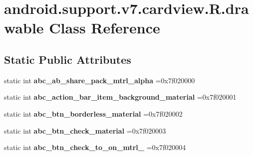 \hypertarget{classandroid_1_1support_1_1v7_1_1cardview_1_1R_1_1drawable}{}\section{android.\+support.\+v7.\+cardview.\+R.\+drawable Class Reference}
\label{classandroid_1_1support_1_1v7_1_1cardview_1_1R_1_1drawable}
\subsection*{Static Public Attributes}
\begin{DoxyCompactItemize}
\item 
\mbox{\label{classandroid_1_1support_1_1v7_1_1cardview_1_1R_1_1drawable_ab42b228f8b8554bd2ffbdbe4b370e45f}} 
static int {\bfseries abc\+\_\+ab\+\_\+share\+\_\+pack\+\_\+mtrl\+\_\+alpha} =0x7f020000
\item 
\mbox{\label{classandroid_1_1support_1_1v7_1_1cardview_1_1R_1_1drawable_a973b85988cb79fe5600e84b09d7e7cfe}} 
static int {\bfseries abc\+\_\+action\+\_\+bar\+\_\+item\+\_\+background\+\_\+material} =0x7f020001
\item 
\mbox{\label{classandroid_1_1support_1_1v7_1_1cardview_1_1R_1_1drawable_a3e57337d413423c2edb0f03937c8c875}} 
static int {\bfseries abc\+\_\+btn\+\_\+borderless\+\_\+material} =0x7f020002
\item 
\mbox{\label{classandroid_1_1support_1_1v7_1_1cardview_1_1R_1_1drawable_a5b5d3fc451781932a221909fb1868d8c}} 
static int {\bfseries abc\+\_\+btn\+\_\+check\+\_\+material} =0x7f020003
\item 
\mbox{\label{classandroid_1_1support_1_1v7_1_1cardview_1_1R_1_1drawable_a886456a9a58729ece966e04d4f7095c3}} 
static int {\bfseries abc\+\_\+btn\+\_\+check\+\_\+to\+\_\+on\+\_\+mtrl\+\_} =0x7f020004
\item 
\mbox{\label{classandroid_1_1support_1_1v7_1_1cardview_1_1R_1_1drawable_ac81144470452cdcca6f2a419e2b35b09}} 

\end{DoxyCompactItemize}
